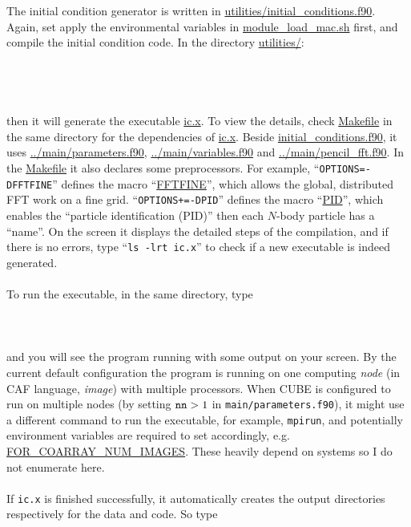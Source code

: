 \documentclass[12pt]{article}
\begin{document}
The initial condition generator is written in \url{utilities/initial_conditions.f90}. Again, set apply the environmental variables in \url{module_load_mac.sh} first, and compile the initial condition code. In the directory \url{utilities/}:
\\\\
\\
\\\\
then it will generate the executable \url{ic.x}. To view the details, check \url{Makefile} in the same directory for the dependencies of \url{ic.x}. Beside \url{initial_conditions.f90}, it uses \url{../main/parameters.f90}, \url{../main/variables.f90} and \url{../main/pencil_fft.f90}. In the \url{Makefile} it also declares some preprocessors. For example, ``{\tt OPTIONS=-DFFTFINE}'' defines the macro ``\url{FFTFINE}'', which allows the global, distributed FFT work on a fine grid. ``{\tt OPTIONS+=-DPID}'' defines the macro ``\url{PID}'', which enables the ``particle identification (PID)'' then each $N$-body particle has a ``name''. On the screen it displays the detailed steps of the compilation, and if there is no errors, type ``{\tt ls -lrt ic.x}'' to check if a new executable is indeed generated.
\\\\
To run the executable, in the same directory, type
\\\\
\\\\
and you will see the program running with some output on your screen. By the current default configuration the program is running on one computing {\it node} (in CAF language, {\it image}) with multiple processors. When CUBE is configured to run on multiple nodes (by setting ${\tt nn}>1$ in {\tt main/parameters.f90}), it might use a different command to run the executable, for example, {\tt mpirun}, and potentially environment variables are required to set accordingly, e.g. \url{FOR_COARRAY_NUM_IMAGES}. These heavily depend on systems so I do not enumerate here.
\\\\
If {\tt ic.x} is finished successfully, it automatically creates the output directories respectively for the data and code. So type
\\\\
\end{document}
